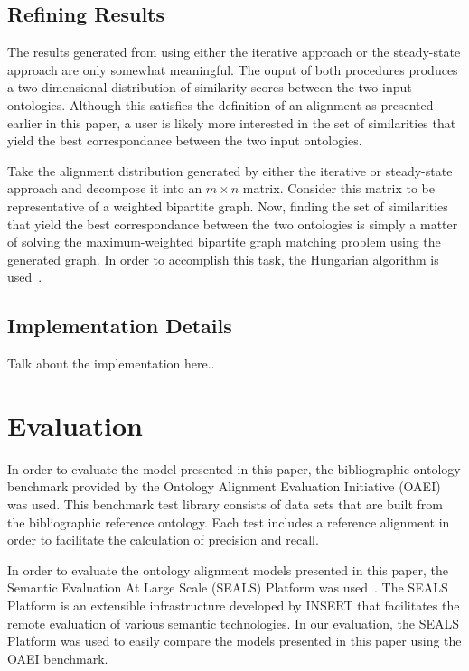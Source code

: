 \documentclass[letterpaper,twocolumn,12pt]{article}
\begin{document}
\subsection{Refining Results}

The results generated from using either the iterative approach or the steady-state approach are only somewhat meaningful.
The ouput of both procedures produces a two-dimensional distribution of similarity scores between the two input ontologies.
Although this satisfies the definition of an alignment as presented earlier in this paper, a user is likely more interested in the set of similarities that yield the best correspondance between the two input ontologies.

Take the alignment distribution generated by either the iterative or steady-state approach and decompose it into an $m \times n$ matrix.
Consider this matrix to be representative of a weighted bipartite graph.
Now, finding the set of similarities that yield the best correspondance between the two ontologies is simply a matter of solving the maximum-weighted bipartite graph matching problem using the generated graph.
In order to accomplish this task, the Hungarian algorithm is used~\cite{kuhn:1955:hungarian}.

\subsection{Implementation Details}

Talk about the implementation here..

\section{Evaluation}
\label{sec:eval}

In order to evaluate the model presented in this paper, the bibliographic ontology benchmark provided by the Ontology Alignment Evaluation Initiative (OAEI) was used.
This benchmark test library consists of data sets that are built from the bibliographic reference ontology.
Each test includes a reference alignment in order to facilitate the calculation of precision and recall.

In order to evaluate the ontology alignment models presented in this paper, the Semantic Evaluation At Large Scale (SEALS) Platform was used~\cite{esteban:2010:executing, wrigley:2010:evaluating}.
The SEALS Platform is an extensible infrastructure developed by INSERT that facilitates the remote evaluation of various semantic technologies.
In our evaluation, the SEALS Platform was used to easily compare the models presented in this paper using the OAEI benchmark.
\end{document}
